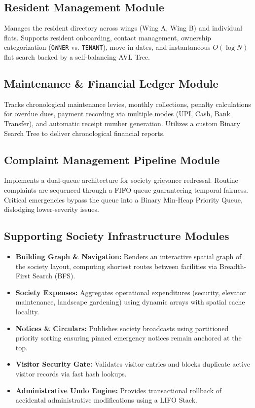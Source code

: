 \documentclass[12pt,a4paper]{article}
\begin{document}
\subsection{Resident Management Module}
Manages the resident directory across wings (Wing A, Wing B) and individual flats. Supports resident onboarding, contact management, ownership categorization (\texttt{OWNER} vs. \texttt{TENANT}), move-in dates, and instantaneous $O(\log N)$ flat search backed by a self-balancing AVL Tree.

\subsection{Maintenance \& Financial Ledger Module}
Tracks chronological maintenance levies, monthly collections, penalty calculations for overdue dues, payment recording via multiple modes (UPI, Cash, Bank Transfer), and automatic receipt number generation. Utilizes a custom Binary Search Tree to deliver chronological financial reports.

\subsection{Complaint Management Pipeline Module}
Implements a dual-queue architecture for society grievance redressal. Routine complaints are sequenced through a FIFO queue guaranteeing temporal fairness. Critical emergencies bypass the queue into a Binary Min-Heap Priority Queue, dislodging lower-severity issues.

\subsection{Supporting Society Infrastructure Modules}
\begin{itemize}[leftmargin=1.5em]
    \item \textbf{Building Graph \& Navigation:} Renders an interactive spatial graph of the society layout, computing shortest routes between facilities via Breadth-First Search (BFS).
    \item \textbf{Society Expenses:} Aggregates operational expenditures (security, elevator maintenance, landscape gardening) using dynamic arrays with spatial cache locality.
    \item \textbf{Notices \& Circulars:} Publishes society broadcasts using partitioned priority sorting ensuring pinned emergency notices remain anchored at the top.
    \item \textbf{Visitor Security Gate:} Validates visitor entries and blocks duplicate active visitor records via fast hash lookups.
    \item \textbf{Administrative Undo Engine:} Provides transactional rollback of accidental administrative modifications using a LIFO Stack.
\end{itemize}
\end{document}

